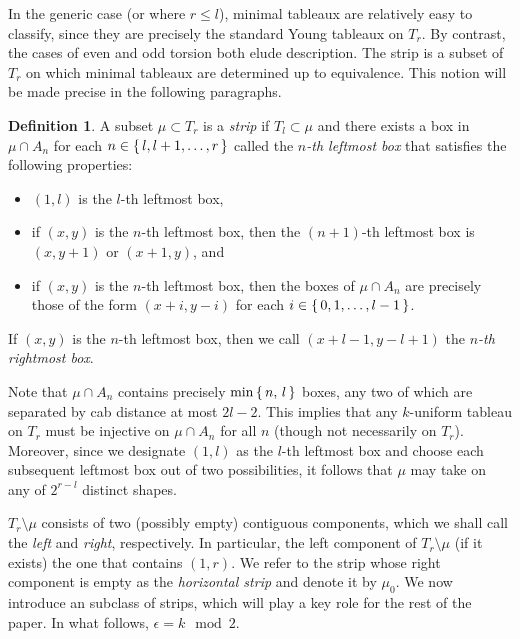 \documentclass[11pt,reqno]{amsart}
\theoremstyle{definition}
\newtheorem{definition}{Definition}[section]
\theoremstyle{problem}
\theoremstyle{plain}
\theoremstyle{remark}
\theoremstyle{theorem}
\numberwithin{equation}{section}
\numberwithin{figure}{section}
\theoremstyle{definition}
\newtheorem{definition}{Definition}[section]
\theoremstyle{problem}
\theoremstyle{plain}
\begin{document}
In the generic case (or where $r \leq l$), minimal tableaux are
relatively easy to classify, since they are precisely the standard
Young tableaux on $T_r$.  By contrast, the cases of even and odd
torsion both elude description.  The strip is a subset of $T_r$ on
which minimal tableaux are determined up to equivalence.  This notion
will be made precise in the following paragraphs.

\begin{definition}
  A subset $\mu \subset T_r$ is a \textit{strip} if $T_l \subset \mu$
  and there exists a box in $\mu \cap A_n$ for each
  $n \in \set{l,l+1,\ldots,r}$ called the \emph{$n$-th leftmost box}
  that satisfies the following properties:
  \begin{itemize}
  \item $(1,l)$ is the $l$-th leftmost box, 
  \item if $(x,y)$ is the $n$-th leftmost box, then the
    $(n+1)$-th leftmost box is $(x,y+1)$ or $(x+1,y)$, and
  \item if $(x,y)$ is the $n$-th leftmost box, then the boxes of
    $\mu \cap A_n$ are precisely those of the form $(x+i,y-i)$ for
    each $i \in \set{0,1,\ldots,l-1}$.
  \end{itemize}
  If $(x,y)$ is the $n$-th leftmost box, then we call $(x+l-1,y-l+1)$
  the \textit{$n$-th rightmost box}.
\end{definition}
  
Note that $\mu \cap A_n$ contains precisely $\min \set{n,\,l}$ boxes, any two
of which are separated by cab distance at most $2l-2$.  This implies
that any $k$-uniform tableau on $T_r$ must be injective on $\mu \cap A_n$ for
all $n$ (though not necessarily on $T_r$).  Moreover, since we
designate $(1,l)$ as the $l$-th leftmost box and choose each
subsequent leftmost box out of two possibilities, it follows that
$\mu$ may take on any of $2^{r-l}$ distinct shapes.

$T_r\setminus\mu$ consists of two (possibly empty) contiguous
components, which we shall call the \emph{left} and \emph{right}, respectively.  In
particular, the left component of $T_r\setminus\mu$ (if it exists) the
one that contains $(1,r)$.  We refer to the strip whose right component is empty as
 the \textit{horizontal strip} and denote it by $\mu_0$. 
We now introduce an subclass of  strips, which will play a key role for the rest of the paper. In what follows, $\epsilon=k\mod 2$. 
\end{document}
